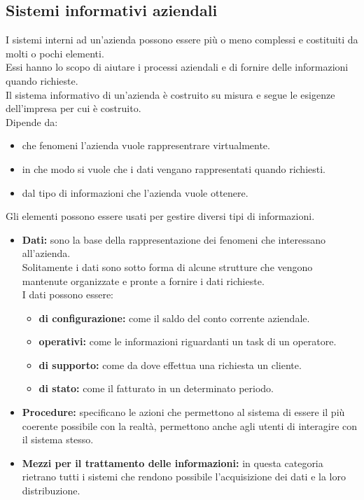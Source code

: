 \documentclass{book}
\begin{document}
    \subsection{Sistemi informativi aziendali}
    I sistemi interni ad un'azienda possono essere più o meno complessi e costituiti da molti o pochi elementi.\\
    Essi hanno lo scopo di aiutare i processi aziendali e di fornire delle informazioni quando richieste.\\
    Il sistema informativo di un'azienda è costruito su misura e segue le esigenze dell'impresa per cui è costruito.\\
    Dipende da:
    \begin{itemize}
        \item che fenomeni l'azienda vuole rappresentrare virtualmente.
        \item in che modo si vuole che i dati vengano rappresentati quando richiesti.
        \item dal tipo di informazioni che l'azienda vuole ottenere.
    \end{itemize}
    Gli elementi possono essere usati per gestire diversi tipi di informazioni.
    \begin{itemize}
        \item \textbf{Dati:} sono la base della rappresentazione dei fenomeni che interessano all'azienda.\\
            Solitamente i dati sono sotto forma di alcune strutture che vengono mantenute organizzate e pronte a fornire i dati richieste.\\
            I dati possono essere:
            \begin{itemize}
                \item \textbf{di configurazione:} come il saldo del conto corrente aziendale.
                \item \textbf{operativi:} come le informazioni riguardanti un task di un operatore.
                \item \textbf{di supporto:} come da dove effettua una richiesta un cliente.
                \item \textbf{di stato:} come il fatturato in un determinato periodo. 
            \end{itemize}
            \item \textbf{Procedure:} specificano le azioni che permettono al sistema di essere il più coerente possibile con la realtà, permettono anche agli utenti di interagire con il sistema stesso.
            \item \textbf{Mezzi per il trattamento delle informazioni:} in questa categoria rietrano tutti i sistemi che rendono possibile l'acquisizione dei dati e la loro distribuzione.
    \end{itemize}
\end{document}

